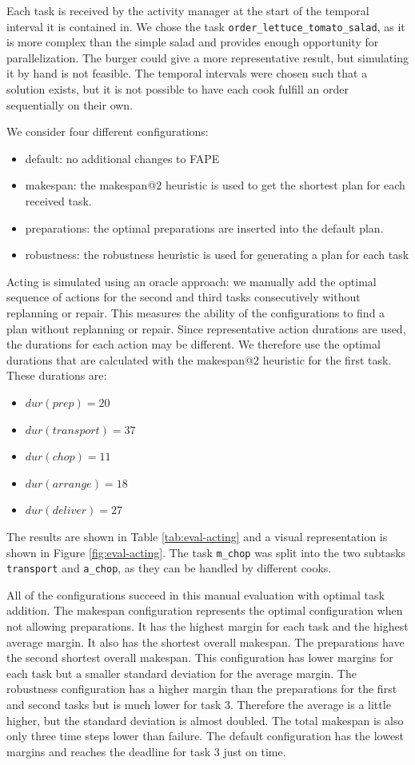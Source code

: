 Each task is received by the activity manager at the start of the temporal interval it is contained in.
We chose the task \verb|order_lettuce_tomato_salad|, as it is more complex than the simple salad and provides enough opportunity for parallelization.
The burger could give a more representative result, but simulating it by hand is not feasible.
The temporal intervals were chosen such that a solution exists, but it is not possible to have each cook fulfill an order sequentially on their own.

We consider four different configurations:
\begin{itemize}
  \item default: no additional changes to \ac{FAPE}
  \item makespan: the makespan@2 heuristic is used to get the shortest plan for each received task.
  \item preparations: the optimal preparations are inserted into the default plan.
  \item robustness: the robustness heuristic is used for generating a plan for each task
\end{itemize}

Acting is simulated using an oracle approach: we manually add the optimal sequence of actions for the second and third tasks consecutively without replanning or repair.
This measures the ability of the configurations to find a plan without replanning or repair.
Since representative action durations are used, the durations for each action may be different.
We therefore use the optimal durations that are calculated with the makespan@2 heuristic for the first task.
These durations are: 
\begin{itemize}
  \item $dur(prep)=20$
  \item $dur(transport)=37$
  \item $dur(chop)=11$
  \item $dur(arrange)=18$
  \item $dur(deliver)=27$
\end{itemize}

The results are shown in Table \ref{tab:eval-acting} and a visual representation is shown in Figure \ref{fig:eval-acting}.
The task \verb|m_chop| was split into the two subtasks \verb|transport| and \verb|a_chop|, as they can be handled by different cooks. 

All of the configurations succeed in this manual evaluation with optimal task addition.
The makespan configuration represents the optimal configuration when not allowing preparations.
It has the highest margin for each task and the highest average margin.
It also has the shortest overall makespan.
The preparations have the second shortest overall makespan.
This configuration has lower margins for each task but a smaller standard deviation for the average margin.
The robustness configuration has a higher margin than the preparations for the first and second tasks but is much lower for task 3.
Therefore the average is a little higher, but the standard deviation is almost doubled.
The total makespan is also only three time steps lower than failure.
The default configuration has the lowest margins and reaches the deadline for task 3 just on time.


